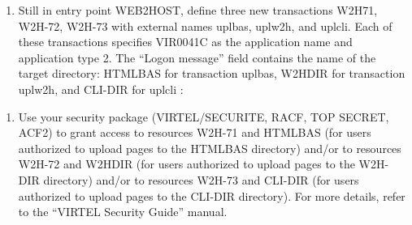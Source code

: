 \documentclass[letterpaper,10pt,english]{sphinxmanual}
\begin{document}
\begin{enumerate}
\def\theenumi{\arabic{enumi}}
\def\labelenumi{\theenumi .}
\makeatletter\def\p@enumii{\p@enumi \theenumi .}\makeatother
\setcounter{enumi}{1}
\item {} 
Still in entry point WEB2HOST, define three new transactions W2H\textendash{}71, W2H-72, W2H-73 with external names uplbas, uplw2h, and uplcli. Each of these transactions specifies VIR0041C as the application name and application type 2. The “Logon message” field contains the name of the target directory: HTMLBAS for transaction uplbas, W2HDIR for transaction uplw2h, and CLI-DIR for uplcli :

\end{enumerate}

 

 

 
\begin{enumerate}
\def\theenumi{\arabic{enumi}}
\def\labelenumi{\theenumi .}
\makeatletter\def\p@enumii{\p@enumi \theenumi .}\makeatother
\setcounter{enumi}{2}
\item {} 
Use your security package (VIRTEL/SECURITE, RACF, TOP SECRET, ACF2) to grant access to resources W2H-71 and HTMLBAS (for users authorized to upload pages to the HTMLBAS directory) and/or to resources W2H-72 and W2HDIR (for users authorized to upload pages to the W2H-DIR directory) and/or to resources W2H-73 and CLI-DIR (for users authorized to upload pages to the CLI-DIR directory). For more details, refer to the “VIRTEL Security Guide” manual.

\end{enumerate}

\ignorespaces 
\end{document}

